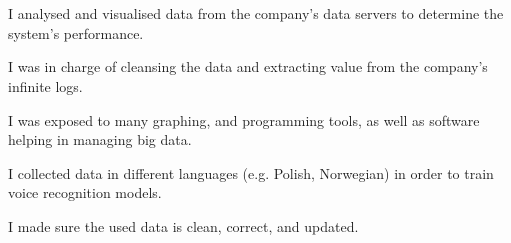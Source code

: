 \documentclass[]{deedy-resume-openfont}
\begin{document}
\begin{minipage}[t]{0.49\textwidth}
\sectionsep

\sectionsep

\sectionsep

%
%

\end{minipage} 
\hfill
\begin{minipage}[t]{0.48\textwidth} 


\section{ \quad {}}

\vspace{8pt}
\begin{tightemize}
\item I analysed and visualised data from the company's data servers to determine the system's performance.
\item I was in charge of cleansing the data and extracting value from the company's infinite logs.
\item I was exposed to many graphing, and programming tools, as well as software helping in managing big data.
\end{tightemize}
\sectionsep

\begin{tightemize}
\item I collected data in different languages (e.g. Polish, Norwegian) in order to train voice recognition models.
\item I made sure the used data is clean, correct, and updated.
\end{tightemize}
\sectionsep


\end{minipage}
\end{document}
